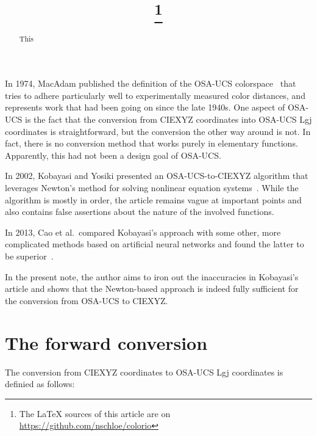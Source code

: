 \documentclass{scrartcl}
\title{\mytitle\footnote{The LaTeX sources of this article are on \url{https://github.com/nschloe/colorio}}}
\author{\myauthor}
\theoremstyle{named}
\begin{document}
\maketitle
\begin{abstract}
  This
\end{abstract}

In 1974, MacAdam published the definition of the OSA-UCS colorspace~\cite{macadam} that
tries to adhere particularly well to experimentally measured color distances, and
represents work that had been going on since the late 1940s.  One aspect of OSA-UCS is
the fact that the conversion from CIEXYZ coordinates into OSA-UCS Lgj coordinates is
straightforward, but the conversion the other way around is not. In fact, there is no
conversion method that works purely in elementary functions. Apparently, this had not
been a design goal of OSA-UCS.

In 2002, Kobayasi and Yosiki presented an OSA-UCS-to-CIEXYZ algorithm that leverages
Newton's method for solving nonlinear equation systems~\cite{kobayasi}. While the
algorithm is mostly in order, the article remains vague at important points and also
contains false assertions about the nature of the involved functions.

In 2013, Cao et al.\ compared Kobayasi's approach with some other, more complicated
methods based on artificial neural networks and found the latter to be
superior~\cite{cao}.

In the present note, the author aims to iron out the inaccuracies in Kobayasi's article
and shows that the Newton-based approach is indeed fully sufficient for the conversion
from OSA-UCS to CIEXYZ.

\section{The forward conversion}

The conversion from CIEXYZ coordinates to OSA-UCS Lgj coordinates is definied as
follows:
\end{document}
